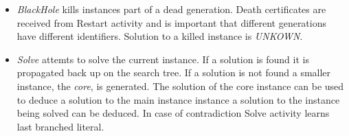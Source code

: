 \begin{itemize}
  \item \emph{BlackHole} kills instances part of a dead generation.
  Death certificates are received from Restart activity and is important
  that different generations have different identifiers. Solution to
  a killed instance is \emph{UNKOWN}.

  \item \emph{Solve} attemts to solve the current instance. If a solution
  is found it is propagated back up on the search tree. If a solution
  is not found a smaller instance, the \emph{core}, is generated. The solution
  of the core instance can be used to deduce a solution to the main instance
  instance a solution to the instance being solved can be deduced. In case
  of contradiction Solve activity learns last branched literal.

\end{itemize}


